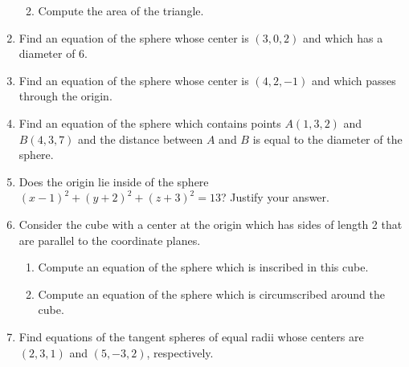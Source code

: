 \documentclass[12pt]{article}
\newif\ifans
\begin{document}
\begin{enumerate}
\begin{enumerate}
\ifans{\fbox{The length of all sides of the triangle is $\sqrt{24}$}} \fi

\item Compute the area of the triangle.

\ifans{\fbox{$6\sqrt{3}$ square units}} \fi

\end{enumerate}

\item Find an equation of the sphere whose center is $(3,0,2)$ and which has a diameter of 6.

\ifans{\fbox{$(x-3)^2+y^2+(z-2)^2=9$}} \fi

\item Find an equation of the sphere whose center is $(4,2,-1)$ and which passes through the origin.

\ifans{\fbox{$(x-4)^2+(y-2)^2+(z+1)^2=21$}} \fi

\item Find an equation of the sphere which contains points $A(1,3,2)$ and $B(4,3,7)$ and the distance between $A$ and $B$ is equal to the diameter of the sphere.

\ifans{\fbox{$\left(x-\frac{5}{2}\right)^2+(y-3)^2+\left(z-\frac{9}{2}\right)^2=\frac{17}{2}$}} \fi

\item Does the origin lie inside of the sphere $(x-1)^2+(y+2)^2+(z+3)^2=13$?  Justify your answer.

\ifans{\fbox{\parbox{1\linewidth}{No.  The distance from the origin to the center $(1,-2,-3)$ is $\sqrt{14}$ which is greater than the radius, $\sqrt{13}$.}}} \fi

\item Consider the cube with a center at the origin which has sides of length 2 that are parallel to the coordinate planes.  

\begin{enumerate}

\item Compute an equation of the sphere which is inscribed in this cube.

\ifans{\fbox{$x^2+y^2+z^2=1$}} \fi

\item Compute an equation of the sphere which is circumscribed around the cube.

\ifans{\fbox{$x^2+y^2+z^2=3$}} \fi

\end{enumerate}

\item Find equations of the tangent spheres of equal radii whose centers are $(2,3,1)$ and $(5,-3,2)$, respectively.


\end{enumerate}
\end{document}
